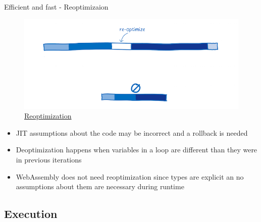 \documentclass{beamer}
\begin{document}
\begin{frame}{Efficient and fast - Reoptimizaion}
    \begin{figure}
        \includegraphics[scale=0.2]{./images/re-optimize.png}
        \caption{\href{https://www.smashingmagazine.com/2017/05/abridged-cartoon-introduction-webassembly/}{Reoptimization}}
    \end{figure}
    \begin{itemize}
        \item JIT assumptions about the code may be incorrect and a rollback is needed
        \item Deoptimization happens when variables in a loop are different than they were in previous iterations
        \item WebAssembly does not need reoptimization since types are explicit an no assumptions about them are necessary during runtime
    \end{itemize}
\end{frame}

\subsection{Execution}
\end{document}
